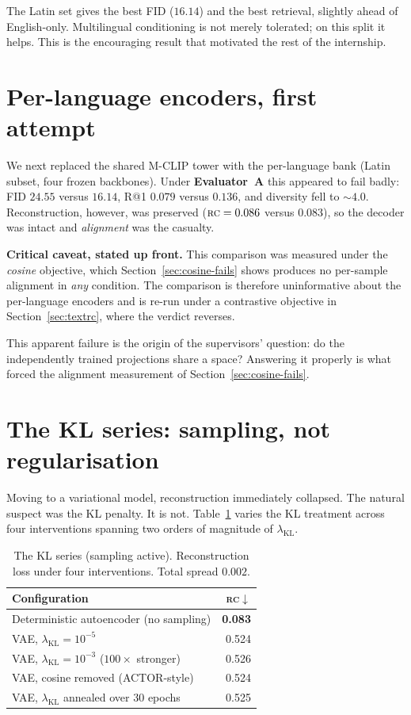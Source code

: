\documentclass[11pt,a4paper]{report}
\newcommand{\rc}{\textsc{rc}}
\newcommand{\best}[1]{\textbf{#1}}
\newcommand{\lkl}{\ensuremath{\lambda_{\mathrm{KL}}}}
\newcommand{\callout}[1]{\begin{calloutenv}\small #1\end{calloutenv}}
\begin{document}
The Latin set gives the best FID ($16.14$) and the best retrieval, slightly
ahead of English-only. Multilingual conditioning is not merely tolerated;
on this split it helps. This is the encouraging result that motivated the
rest of the internship.

\section{Per-language encoders, first attempt}
\label{sec:perlang-first}

We next replaced the shared M-CLIP tower with the per-language bank (Latin
subset, four frozen backbones). Under \textbf{Evaluator~A} this appeared to
fail badly: FID $24.55$ versus $16.14$, R@1 $0.079$ versus $0.136$, and
diversity fell to ${\sim}4.0$. Reconstruction, however, was preserved
($\rc = 0.086$ versus $0.083$), so the decoder was intact and
\emph{alignment} was the casualty.

\callout{\textbf{Critical caveat, stated up front.} This comparison was
measured under the \emph{cosine} objective, which
Section~\ref{sec:cosine-fails} shows produces no per-sample alignment in
\emph{any} condition. The comparison is therefore uninformative about the
per-language encoders and is re-run under a contrastive objective in
Section~\ref{sec:textrc}, where the verdict reverses.}

This apparent failure is the origin of the supervisors' question: do the
independently trained projections share a space? Answering it
properly is what forced the alignment measurement of
Section~\ref{sec:cosine-fails}.

\section{The KL series: sampling, not regularisation}
\label{sec:kl-series}

Moving to a variational model, reconstruction immediately collapsed. The
natural suspect was the KL penalty. It is not.
Table~\ref{tab:kl-series} varies the KL treatment across four interventions
spanning two orders of magnitude of \lkl{}.

\begin{table}[H]
\centering
\caption{The KL series (sampling active). Reconstruction loss under four
interventions. Total spread $0.002$.}
\label{tab:kl-series}
\small
\begin{tabular}{@{}lr@{}}
\toprule
Configuration & \rc$\downarrow$ \\
\midrule
Deterministic autoencoder (no sampling) & \best{0.083} \\
VAE, $\lkl=10^{-5}$ & 0.524 \\
VAE, $\lkl=10^{-3}$ ($100\times$ stronger) & 0.526 \\
VAE, cosine removed (ACTOR-style) & 0.524 \\
VAE, $\lkl$ annealed over 30 epochs & 0.525 \\
\bottomrule
\end{tabular}
\end{table}
\end{document}
